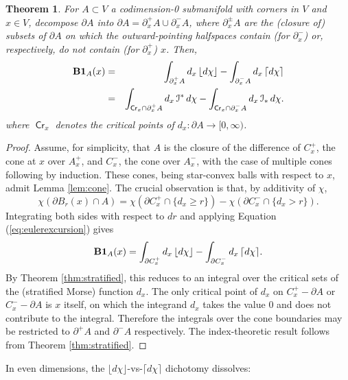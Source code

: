\documentclass{psapm-l}
\newtheorem{theorem}{Theorem}[section]
\theoremstyle{definition}
\theoremstyle{remark}
\numberwithin{equation}{section}
\begin{document}
\begin{theorem}
\label{thm:besseldchi}
For $A\subset V$ a codimension-0 submanifold with corners in $V$ and $x\in V$, decompose ${\partial} A$ into ${\partial} A={\partial}_x^+A\cup{\partial}_x^-A$, where ${\partial}_x^\pm A$ are the (closure of) subsets of ${\partial} A$ on which the outward-pointing halfspaces  contain (for ${\partial}_x^-$) or, respectively, do not contain (for ${\partial}_x^+$) $x$. Then,
\begin{eqnarray}
\label{eq:besselindex}
    {{\bf B}}{{\mathbf{1}}}_A(x)
            &=& \int_{{\partial}_x^+A} d_x\, {{\lfloor d\chi\rfloor}} - \int_{{\partial}_x^-A} d_x\, {{\lceil d\chi\rceil}} \\
            &=& \int_{{{{\operatorname{\mathsf{{Cr}}}}}}_x\cap{\partial}_x^+A} d_x\, {{\mathcal I}}^*\, d\chi - \int_{{{{\operatorname{\mathsf{{Cr}}}}}}_x\cap{\partial}_x^-A} d_x\, {{\mathcal I}}_*\, d\chi .
\end{eqnarray}
where ${{{\operatorname{\mathsf{{Cr}}}}}}_x$ denotes the critical points of $d_x\colon{\partial} A\to[0,\infty)$.
\end{theorem}
\begin{proof}
Assume, for simplicity, that $A$ is the closure of the difference of $C^+_x$, the cone at $x$ over $A^+_x$, and $C^-_x$, the cone over $A^-_x$, with the case of multiple cones following by induction. These cones, being star-convex balls with respect to $x$, admit  Lemma \ref{lem:cone}. The crucial observation is that, by additivity of $\chi$,
\[
        \chi({\partial} B_r(x) \cap A) = \chi({\partial} C^+_x\cap\{d_x\geq r\}) - \chi({\partial} C^-_x\cap\{d_x>r\}) .
\]
Integrating both sides with respect to $dr$ and applying Equation (\ref{eq:eulerexcursion}) gives
\[
        {{\bf B}}{{\mathbf{1}}}_A(x) = \int_{{\partial} C^+_x}d_x\,{{\lfloor d\chi\rfloor}} - \int_{{\partial} C^-_x}d_x\,{{\lceil d\chi\rceil}} .
\]
By Theorem \ref{thm:stratified}, this reduces to an integral over the critical sets of the (stratified Morse) function $d_x$. The only critical point of $d_x$ on $C^+_x-{\partial} A$ or $C^-_x-{\partial} A$ is $x$ itself, on which the integrand $d_x$ takes the value $0$ and does not contribute to the integral. Therefore the integrals over the cone boundaries may be restricted to ${\partial}^+A$ and ${\partial}^-A$ respectively. The index-theoretic result follows from Theorem \ref{thm:stratified}.
\end{proof}

In even dimensions, the ${{\lfloor d\chi\rfloor}}$-vs-${{\lceil d\chi\rceil}}$ dichotomy dissolves:
\end{document}
